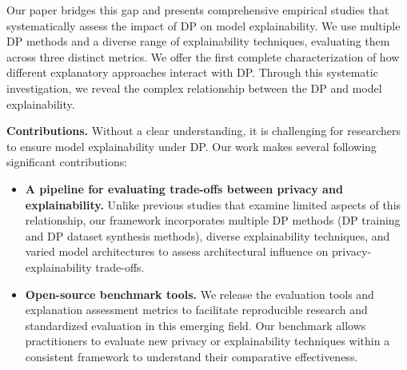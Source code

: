 \documentclass{article}
\begin{document}
Our paper bridges this gap and presents comprehensive empirical studies that systematically assess the impact of DP on model explainability. We use multiple DP methods and a diverse range of explainability techniques, evaluating them across three distinct metrics. We offer the first complete characterization of how different explanatory approaches interact with DP. Through this systematic investigation, we reveal the complex relationship between the DP and model explainability. 

\noindent \textbf{Contributions.} Without a clear understanding, it is challenging for researchers to ensure model explainability under DP. Our work makes several following significant contributions:
\begin{itemize}[leftmargin=*]
    \item \textbf{A pipeline for evaluating trade-offs between privacy and explainability.} Unlike previous studies that examine limited aspects of this relationship, our framework incorporates multiple DP methods (DP training and DP dataset synthesis methods), diverse explainability techniques, and varied model architectures to assess architectural influence on privacy-explainability trade-offs.

    \item \textbf{Open-source benchmark tools.} We release the evaluation tools and explanation assessment metrics to facilitate reproducible research and standardized evaluation in this emerging field. Our benchmark allows practitioners to evaluate new privacy or explainability techniques within a consistent framework to understand their comparative effectiveness.
\end{itemize}
\end{document}
